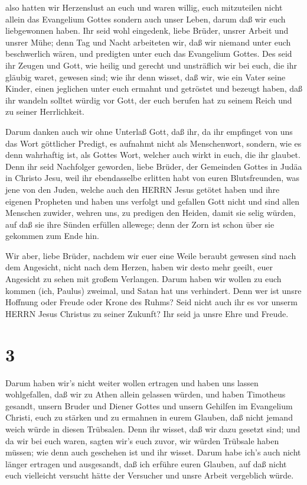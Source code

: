  also hatten wir Herzenslust an euch und waren willig, euch
mitzuteilen nicht allein das Evangelium Gottes sondern auch unser Leben,
darum daß wir euch liebgewonnen haben.  Ihr seid wohl
eingedenk, liebe Brüder, unsrer Arbeit und unsrer Mühe; denn Tag und
Nacht arbeiteten wir, daß wir niemand unter euch beschwerlich wären, und
predigten unter euch das Evangelium Gottes.  Des seid ihr
Zeugen und Gott, wie heilig und gerecht und unsträflich wir bei euch,
die ihr gläubig waret, gewesen sind;  wie ihr denn wisset,
daß wir, wie ein Vater seine Kinder, einen jeglichen unter euch ermahnt
und getröstet  und bezeugt haben, daß ihr wandeln solltet
würdig vor Gott, der euch berufen hat zu seinem Reich und zu seiner
Herrlichkeit.

 Darum danken auch wir ohne Unterlaß Gott, daß ihr, da ihr
empfinget von uns das Wort göttlicher Predigt, es aufnahmt nicht als
Menschenwort, sondern, wie es denn wahrhaftig ist, als Gottes Wort,
welcher auch wirkt in euch, die ihr glaubet.  Denn ihr seid
Nachfolger geworden, liebe Brüder, der Gemeinden Gottes in Judäa in
Christo Jesu, weil ihr ebendasselbe erlitten habt von euren
Blutsfreunden, was jene von den Juden,  welche auch den
HERRN Jesus getötet haben und ihre eigenen Propheten und haben uns
verfolgt und gefallen Gott nicht und sind allen Menschen zuwider,
 wehren uns, zu predigen den Heiden, damit sie selig
würden, auf daß sie ihre Sünden erfüllen allewege; denn der Zorn ist
schon über sie gekommen zum Ende hin.

 Wir aber, liebe Brüder, nachdem wir euer eine Weile
beraubt gewesen sind nach dem Angesicht, nicht nach dem Herzen, haben
wir desto mehr geeilt, euer Angesicht zu sehen mit großem Verlangen.
 Darum haben wir wollen zu euch kommen (ich, Paulus)
zweimal, und Satan hat uns verhindert.  Denn wer ist unsre
Hoffnung oder Freude oder Krone des Ruhms? Seid nicht auch ihr es vor
unserm HERRN Jesus Christus zu seiner Zukunft?  Ihr seid ja
unsre Ehre und Freude.

\hypertarget{section-2}{%
\section{3}\label{section-2}}

 Darum haben wir's nicht weiter wollen ertragen und haben
uns lassen wohlgefallen, daß wir zu Athen allein gelassen würden,
 und haben Timotheus gesandt, unsern Bruder und Diener
Gottes und unsern Gehilfen im Evangelium Christi, euch zu stärken und zu
ermahnen in eurem Glauben,  daß nicht jemand weich würde in
diesen Trübsalen. Denn ihr wisset, daß wir dazu gesetzt sind;
 und da wir bei euch waren, sagten wir's euch zuvor, wir
würden Trübsale haben müssen; wie denn auch geschehen ist und ihr
wisset.  Darum habe ich's auch nicht länger ertragen und
ausgesandt, daß ich erführe euren Glauben, auf daß nicht euch vielleicht
versucht hätte der Versucher und unsre Arbeit vergeblich würde.

